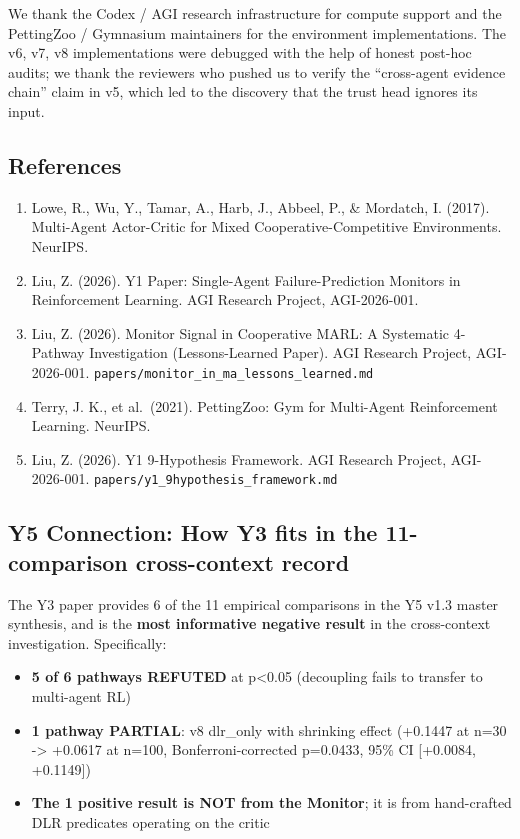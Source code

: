 \documentclass[
]{article}
\providecommand{\tightlist}{%
  \setlength{\itemsep}{0pt}\setlength{\parskip}{0pt}}
\begin{document}
We thank the Codex / AGI research infrastructure for compute support and
the PettingZoo / Gymnasium maintainers for the environment
implementations. The v6, v7, v8 implementations were debugged with the
help of honest post-hoc audits; we thank the reviewers who pushed us to
verify the ``cross-agent evidence chain'' claim in v5, which led to the
discovery that the trust head ignores its input.

\subsection{References}\label{references}

\begin{enumerate}
\def\labelenumi{\arabic{enumi}.}
\tightlist
\item
  Lowe, R., Wu, Y., Tamar, A., Harb, J., Abbeel, P., \& Mordatch, I.
  (2017). Multi-Agent Actor-Critic for Mixed Cooperative-Competitive
  Environments. NeurIPS.
\item
  Liu, Z. (2026). Y1 Paper: Single-Agent Failure-Prediction Monitors in
  Reinforcement Learning. AGI Research Project, AGI-2026-001.
\item
  Liu, Z. (2026). Monitor Signal in Cooperative MARL: A Systematic
  4-Pathway Investigation (Lessons-Learned Paper). AGI Research Project,
  AGI-2026-001. \texttt{papers/monitor\_in\_ma\_lessons\_learned.md}
\item
  Terry, J. K., et al.~(2021). PettingZoo: Gym for Multi-Agent
  Reinforcement Learning. NeurIPS.
\item
  Liu, Z. (2026). Y1 9-Hypothesis Framework. AGI Research Project,
  AGI-2026-001. \texttt{papers/y1\_9hypothesis\_framework.md}
\end{enumerate}

\subsection{Y5 Connection: How Y3 fits in the 11-comparison
cross-context
record}\label{y5-connection-how-y3-fits-in-the-11-comparison-cross-context-record}

The Y3 paper provides 6 of the 11 empirical comparisons in the Y5 v1.3
master synthesis, and is the \textbf{most informative negative result}
in the cross-context investigation. Specifically:

\begin{itemize}
\tightlist
\item
  \textbf{5 of 6 pathways REFUTED} at p\textless0.05 (decoupling fails
  to transfer to multi-agent RL)
\item
  \textbf{1 pathway PARTIAL}: v8 dlr\_only with shrinking effect
  (+0.1447 at n=30 -\textgreater{} +0.0617 at n=100,
  Bonferroni-corrected p=0.0433, 95\% CI {[}+0.0084, +0.1149{]})
\item
  \textbf{The 1 positive result is NOT from the Monitor}; it is from
  hand-crafted DLR predicates operating on the critic
\end{itemize}
\end{document}
